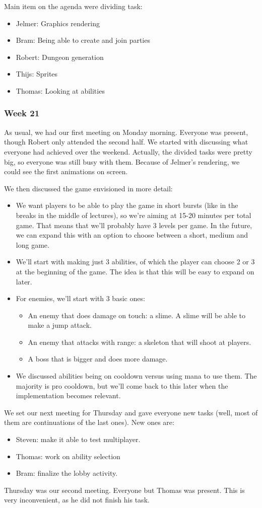 \documentclass[../main.tex]{subfiles}
\begin{document}
Main item on the agenda were dividing task:
\begin{itemize}
	\item Jelmer: Graphics rendering
	\item Bram: Being able to create and join parties
	\item Robert: Dungeon generation
	\item Thijs: Sprites
	\item Thomas: Looking at abilities
\end{itemize}

\subsubsection*{Week 21}
As usual, we had our first meeting on Monday morning. Everyone was present, though Robert only attended the second half. We started with discussing what everyone had achieved over the weekend. Actually, the divided tasks were pretty big, so everyone was still busy with them. Because of Jelmer's rendering, we could see the first animations on screen. 

We then discussed the game envisioned in more detail:
\begin{itemize}
	\item We want players to be able to play the game in short bursts (like in the breaks in the middle of lectures), so we're aiming at 15-20 minutes per total game. That means that we'll probably have 3 levels per game. In the future, we can expand this with an option to choose between a short, medium and long game.
	\item We'll start with making just 3 abilities, of which the player can choose 2 or 3 at the beginning of the game. The idea is that this will be easy to expand on later.
	\item For enemies, we'll start with 3 basic ones:
	\begin{itemize}
		\item An enemy that does damage on touch: a slime. A slime will be able to make a jump attack.
		\item An enemy that attacks with range: a skeleton that will shoot at players.
		\item A boss that is bigger and does more damage.
	\end{itemize}
	\item We discussed abilities being on cooldown versus using mana to use them. The majority is pro cooldown, but we'll come back to this later when the implementation becomes relevant.
\end{itemize}
We set our next meeting for Thursday and gave everyone new tasks (well, most of them are continuations of the last ones). New ones are:
\begin{itemize}
	\item Steven: make it able to test multiplayer.
	\item Thomas: work on ability selection
	\item Bram: finalize the lobby activity.
\end{itemize}
\bigbreak\noindent
Thursday was our second meeting. Everyone but Thomas was present. This is very inconvenient, as he did not finish his task.
\end{document}
